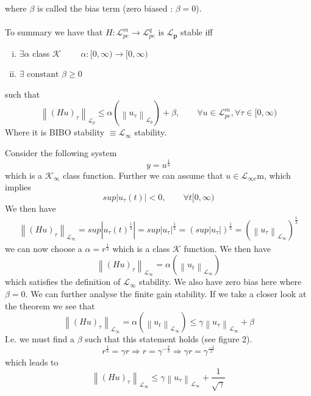 \documentclass{article}
\begin{document}
where $\beta $ is called the bias term (zero biased : $\beta = 0$).
\\\\
To summary we have that $H : \mathcal{L}_{pe}^{m} \to \mathcal{L}_{pe}^{q} \text{ is } \mathbf{\mathcal{L}_p}$ stable iff
\begin{enumerate}[i)]
	\item $\exists \alpha $ class $\mathcal{K}$ $\qquad \alpha : [0, \infty) \to [0, \infty) $
	\item $\exists \text{ constant } \beta  \geq 0$
\end{enumerate}
such that
\begin{equation}
	\left\| (Hu)_\tau  \right\|_{\mathcal{L}_p} \leq \alpha (\left\| u_\tau  \right\|_{\mathcal{L}_p}) + \beta, \qquad \forall u \in \mathcal{L}_{pe}^{m}, \forall \tau \in [0, \infty)
\end{equation}
Where it is BIBO stability $\equiv \mathcal{L}_\infty $ stability.
\begin{frm-ex}
Consider the following system
$$
	y = u^{\frac{1}{3}}
$$
which is a $\mathcal{K}_\infty $ class function. Further we can assume that $u \in  \mathcal{L}_{\infty  e}$m, which implies\
\begin{equation*}
	sup \left| u_\tau (t) \right| < 0, \qquad \forall t [0, \infty )
\end{equation*}
We then have
\begin{equation*}
	\begin{split}
		\left\| (Hu)_\tau \right\|_{\mathcal{L}_\infty } = sup \left| u_\tau(t)^\frac{1}{3} \right|  = sup \left| u_\tau  \right|^\frac{1}{3}
		= (sup \left| u_\tau  \right| )^\frac{1}{3} = (\left\| u_\tau  \right\|_{\mathcal{L}_\infty })^\frac{1}{3}
	\end{split}
\end{equation*}
we can now choose a $\alpha = r^{\frac{1}{3}}$ which is a class $\mathcal{K}$ function. We then have
\begin{equation*}
	\left\| (Hu)_\tau  \right\|_{\mathcal{L}_\infty } = \alpha (\left\| u_t \right\|_{\mathcal{L}_\infty })
\end{equation*}
which satisfies the definition of $\mathcal{L}_\infty $ stability. We also have zero bias here where $\beta = 0$. We can further analyse the finite gain stability. If we take a closer look at the theorem we see that
\begin{equation*}
	\left\| (Hu)_\tau
	\right\|_{\mathcal{L}_\infty } = \alpha (\left\| u_t \right\|_{\mathcal{L}_\infty })  \leq \gamma \left\| u_\tau  \right\|_{\mathcal{L}_\infty } + \beta
\end{equation*}
I.e. we must find a $\beta$ such that this statement holds (see figure 2).
\begin{equation*}
	r^{\frac{1}{3}} = \gamma r \Rightarrow r = \gamma ^{-\frac{2}{3}} \Rightarrow \gamma r= \gamma^\frac{-1}{2}
\end{equation*}
which leads to
\begin{equation*}
	\left\| (Hu)_\tau  \right\| _{\mathcal{L}_\infty } \leq \gamma \left\| u_\tau  \right\|_{\mathcal{L}_\infty} + \frac{1}{\sqrt{\gamma}}
\end{equation*}
\end{frm-ex}
\end{document}
